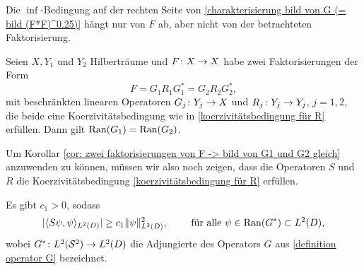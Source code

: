 Die \(\inf\)-Bedingung auf der rechten Seite von \eqref{charakterisierung bild von G (= bild (F*F)^0.25)} hängt nur von \(F\) ab, aber nicht von der betrachteten Faktorisierung.
\begin{cor}\label{cor: zwei faktorisierungen von F -> bild von G1 und G2 gleich}
	Seien \(X,Y_1\) und \(Y_2\) Hilberträume und \(F\colon X \to X\) habe zwei Faktorisierungen der Form
	\begin{equation*}
		F=G_1R_1G_1^\ast = G_2R_2G_2^\ast,
	\end{equation*}
	mit beschränkten linearen Operatoren \(G_j\colon Y_j \to X\) und \(R_j\colon Y_j \to Y_j\), \(j=1,2\), die beide eine Koerzivitätsbedingung wie in \eqref{koerzivitätsbedingung für R} erfüllen. Dann gilt \(\operatorname{Ran}(G_1)=\operatorname{Ran}(G_2)\).
\end{cor}
Um Korollar \ref{cor: zwei faktorisierungen von F -> bild von G1 und G2 gleich} anzuwenden zu können, müssen wir also noch zeigen, dass die Operatoren \(S\) und \(R\) die Koerzivitätsbedingung \eqref{koerzivitätsbedingung für R} erfüllen.
\begin{lem}\label{lem: koerzivität S}
	Es gibt \(c_1>0\), sodass
	\begin{equation}
		\label{koerzivität S}
		|\langle S\psi,\psi\rangle_{L^2(D)}|\geq c_1\|\psi\|_{L^2(D)}^2,\qquad\text{ für alle }\psi\in\operatorname{Ran}(G^\ast)\subset L^2(D),
	\end{equation}
	wobei \(G^\ast\colon L^2(\mathcal{S}^2) \to L^2(D)\) die Adjungierte des Operators \(G\) aus \eqref{definition operator G} bezeichnet.
\end{lem}
